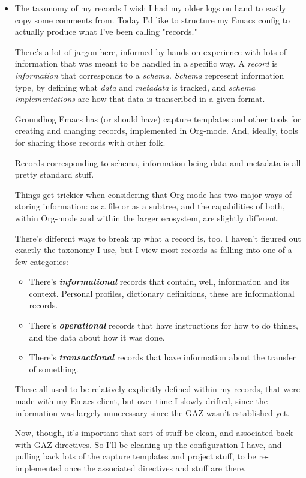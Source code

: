 \documentclass[11pt]{article}
\begin{document}
\begin{itemize}
\item The taxonomy of my records
\label{sec:orgb642953}
I wish I had my older logs on hand to easily copy some comments from. Today I'd like to structure my Emacs config to actually produce what I've been calling "records."

There's a lot of jargon here, informed by hands-on experience with lots of information that was meant to be handled in a specific way. A \emph{record} is \emph{information} that corresponds to a \emph{schema}. \emph{Schema} represent information type, by defining what \emph{data} and \emph{metadata} is tracked, and \emph{schema implementations} are how that data is transcribed in a given format.

Groundhog Emacs has (or should have) capture templates and other tools for creating and changing records, implemented in Org-mode. And, ideally, tools for sharing those records with other folk.

Records corresponding to schema, information being data and metadata is all pretty standard stuff.

Things get trickier when considering that Org-mode has two major ways of storing information: as a file or as a subtree, and the capabilities of both, within Org-mode and within the larger ecosystem, are slightly different.

There's different ways to break up what a record is, too. I haven't figured out exactly the taxonomy I use, but I view most records as falling into one of a few categories:

\begin{itemize}
\item There's \textbf{\emph{informational}} records that contain, well, information and its context. Personal profiles, dictionary definitions, these are informational records.
\item There's \textbf{\emph{operational}} records that have instructions for how to do things, and the data about how it was done.
\item There's \textbf{\emph{transactional}} records that have information about the transfer of something.
\end{itemize}

These all used to be relatively explicitly defined within my records, that were made with my Emacs client, but over time I slowly drifted, since the information was largely unnecessary since the GAZ wasn't established yet.

Now, though, it's important that sort of stuff be clean, and associated back with GAZ directives. So I'll be cleaning up the configuration I have, and pulling back lots of the capture templates and project stuff, to be re-implemented once the associated directives and stuff are there.
\end{itemize}
\stopcontents[level-4]
\end{document}
